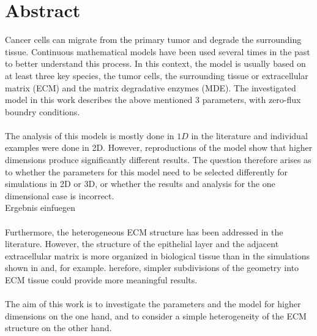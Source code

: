 \section*{Abstract}
Cancer cells can migrate from the primary tumor and degrade the surrounding tissue. Continuous mathematical models have been used several times in the past to better understand this process. In this context, the model is usually based on at least three key species, the tumor cells, the surrounding tissue or extracellular matrix (ECM) and the matrix degradative enzymes (MDE). The investigated model in this work describes the above mentioned 3 parameters, with zero-flux boundry conditions. \\ \\
The analysis of this models is mostly done in $1D$ in the literature and individual examples were done in 2D. However, reproductions of the model show that higher dimensions produce significantly different results. The question therefore arises as to whether the parameters for this model need to 
be selected differently for simulations in 2D or 3D, or whether the results and analysis for the one dimensional case is incorrect. \\
Ergebnis einfuegen\\ \\
Furthermore, the heterogeneous ECM structure has been addressed in the literature. However, the structure of the epithelial layer and the adjacent extracellular matrix is more organized in biological tissue than in the simulations shown in and, for example. herefore, simpler subdivisions of the geometry into ECM tissue could provide more meaningful results. \\ \\
The aim of this work is to investigate the parameters and the model for higher dimensions on the one hand, and to consider a simple heterogeneity of the ECM structure on the other hand.